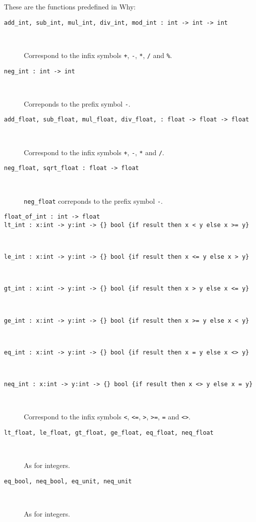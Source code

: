 \documentclass[a4paper,12pt]{report}
\newcommand{\why}{\textsf{Why}}
\begin{document}
These are the functions predefined in \why:
\begin{description}
\item[\texttt{add\_int, sub\_int, mul\_int, div\_int, mod\_int : int
    -> int -> int}] ~\par
  Correspond to the infix symbols
  \texttt{+}, \texttt{-}, \texttt{*}, \texttt{/} and \texttt{\%}.

\item[\texttt{neg\_int : int -> int}] ~\par
  Correponds to the prefix symbol \texttt{-}.

\item[\texttt{add\_float, sub\_float, mul\_float, div\_float,
    : float -> float -> float}] ~\par
  Correspond to the infix symbols
  \texttt{+}, \texttt{-}, \texttt{*} and \texttt{/}.

\item[\texttt{neg\_float, sqrt\_float : float -> float}] ~\par
  \texttt{neg\_float} correponds to the prefix symbol \texttt{-}.

\item[\texttt{float\_of\_int : int -> float}]

\item[\texttt{lt\_int : x:int -> y:int -> \{\} bool \{if result then x
    < y else x >= y\}}] ~\par
\item[\texttt{le\_int : x:int -> y:int -> \{\} bool \{if result then x
    <= y else x > y\}}] ~\par
\item[\texttt{gt\_int : x:int -> y:int -> \{\} bool \{if result then x
    > y else x <= y\}}] ~\par
\item[\texttt{ge\_int : x:int -> y:int -> \{\} bool \{if result then x
    >= y else x < y\}}] ~\par
\item[\texttt{eq\_int : x:int -> y:int -> \{\} bool \{if result then x
    = y else x <> y\}}] ~\par
\item[\texttt{neq\_int : x:int -> y:int -> \{\} bool \{if result then x
    <> y else x = y\}}] ~\par
  Correspond to the infix symbols \texttt{<}, \texttt{<=}, \texttt{>},
  \texttt{>=}, \texttt{=} and \texttt{<>}.

\item[\texttt{lt\_float, le\_float, gt\_float, ge\_float, eq\_float,
    neq\_float}] ~\par
  As for integers.

\item[\texttt{eq\_bool, neq\_bool, eq\_unit, neq\_unit}] ~\par
  As for integers.

\end{description}

\printindex
\end{document}
